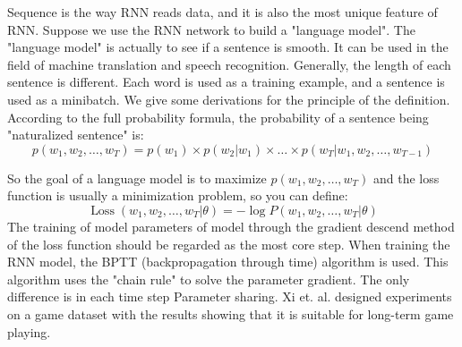 \documentclass[11pt,en]{elegantpaper}
\begin{document}



Sequence is the way RNN reads data, and it is also the most unique feature of RNN. Suppose we use the RNN network to build a "language model". The "language model" is actually to see if a sentence is smooth. It can be used in the field of machine translation and speech recognition. Generally, the length of each sentence is different. Each word is used as a training example, and a sentence is used as a minibatch. We give some derivations for the principle of the definition. According to the full probability formula, the probability of a sentence being "naturalized sentence" is:
$$
p\left(w_{1}, w_{2}, \ldots, w_{T}\right)=p\left(w_{1}\right) \times p\left(w_{2} | w_{1}\right) \times \ldots \times p\left(w_{T} | w_{1}, w_{2}, \ldots, w_{T-1}\right)
$$

So the goal of a language model is to maximize $p\left(w_{1}, w_{2}, \ldots, w_{T}\right)$ and the loss function is usually a minimization problem, so you can define:
$$
\operatorname{Loss}\left(w_{1}, w_{2}, \ldots, w_{T} | \theta\right)=-\log P\left(w_{1}, w_{2}, \ldots, w_{T} | \theta\right)
$$
The training of model parameters of model through the gradient descend method of the loss function should be regarded as the most core step. When training the RNN model, the BPTT (backpropagation through time) algorithm is used. This algorithm uses the "chain rule" to solve the parameter gradient. The only difference is in each time step Parameter sharing. Xi et. al. \cite{rnn1} designed experiments on a game dataset with the results showing that it is suitable for long-term game playing. 
\end{document}
